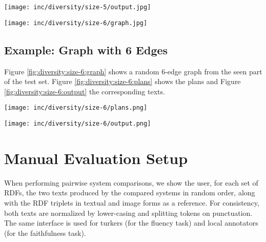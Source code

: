 \documentclass[11pt,a4paper]{article}
\begin{document}
\begin{sidewaysfigure*}
    \centering
    \texttt{[image: inc/diversity/size-5/output.jpg]}
    \caption{Realizations of the plans from Figure \ref{fig:diversity:size-5:plans} as produced by the NMT realizer.}
    \label{fig:diversity:size-5:output}
\end{sidewaysfigure*}
 \clearpage


\begin{figure*}[!hb]
    \centering
    \texttt{[image: inc/diversity/size-6/graph.jpg]}
    \caption{Example of a graph with 6 edges}
    \label{fig:diversity:size-6:graph}
\end{figure*}

\subsection{Example: Graph with 6 Edges}
Figure \ref{fig:diversity:size-6:graph} shows a random 6-edge graph from the seen part of the test set. Figure \ref{fig:diversity:size-6:plans} shows the plans and Figure \ref{fig:diversity:size-6:output} the corresponding texts.






\begin{sidewaysfigure*}
    \centering
    \texttt{[image: inc/diversity/size-6/plans.png]}
    \caption{25 random linearized plans (out of 171,024 possible plans) for the graph in Figure \ref{fig:diversity:size-6:graph}, and their ranks and model scores.}
    \label{fig:diversity:size-6:plans}
\end{sidewaysfigure*}

\begin{sidewaysfigure*}
    \centering
    \texttt{[image: inc/diversity/size-6/output.png]}
    \caption{Realizations of the plans from Figure \ref{fig:diversity:size-6:plans} as produced by the NMT realizer.}
    \label{fig:diversity:size-6:output}
\end{sidewaysfigure*}
 \clearpage

\section{Manual Evaluation Setup}\label{app:manual}
When performing pairwise system comparisons, we show the user, for each set of RDFs, the two texts produced by the compared systems in random order, along with the RDF triplets in textual and image forms as a reference. For consistency, both texts are normalized by lower-casing and splitting tokens on punctuation.
The same interface is used for turkers (for the fluency task) and local annotators (for the faithfulness task).
\end{document}
